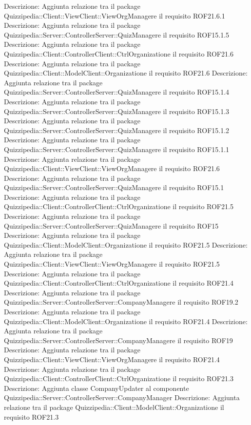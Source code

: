 Descrizione: Aggiunta relazione tra il package Quizzipedia::Client::ViewClient::ViewOrgManagere il requisito ROF21.6.1 
Descrizione: Aggiunta relazione tra il package Quizzipedia::Server::ControllerServer::QuizManagere il requisito ROF15.1.5 
Descrizione: Aggiunta relazione tra il package Quizzipedia::Client::ControllerClient::CtrlOrganizatione il requisito ROF21.6 
Descrizione: Aggiunta relazione tra il package Quizzipedia::Client::ModelClient::Organizatione il requisito ROF21.6 
Descrizione: Aggiunta relazione tra il package Quizzipedia::Server::ControllerServer::QuizManagere il requisito ROF15.1.4 
Descrizione: Aggiunta relazione tra il package Quizzipedia::Server::ControllerServer::QuizManagere il requisito ROF15.1.3 
Descrizione: Aggiunta relazione tra il package Quizzipedia::Server::ControllerServer::QuizManagere il requisito ROF15.1.2 
Descrizione: Aggiunta relazione tra il package Quizzipedia::Server::ControllerServer::QuizManagere il requisito ROF15.1.1 
Descrizione: Aggiunta relazione tra il package Quizzipedia::Client::ViewClient::ViewOrgManagere il requisito ROF21.6 
Descrizione: Aggiunta relazione tra il package Quizzipedia::Server::ControllerServer::QuizManagere il requisito ROF15.1 
Descrizione: Aggiunta relazione tra il package Quizzipedia::Client::ControllerClient::CtrlOrganizatione il requisito ROF21.5 
Descrizione: Aggiunta relazione tra il package Quizzipedia::Server::ControllerServer::QuizManagere il requisito ROF15 
Descrizione: Aggiunta relazione tra il package Quizzipedia::Client::ModelClient::Organizatione il requisito ROF21.5 
Descrizione: Aggiunta relazione tra il package Quizzipedia::Client::ViewClient::ViewOrgManagere il requisito ROF21.5 
Descrizione: Aggiunta relazione tra il package Quizzipedia::Client::ControllerClient::CtrlOrganizatione il requisito ROF21.4 
Descrizione: Aggiunta relazione tra il package Quizzipedia::Server::ControllerServer::CompanyManagere il requisito ROF19.2 
Descrizione: Aggiunta relazione tra il package Quizzipedia::Client::ModelClient::Organizatione il requisito ROF21.4 
Descrizione: Aggiunta relazione tra il package Quizzipedia::Server::ControllerServer::CompanyManagere il requisito ROF19 
Descrizione: Aggiunta relazione tra il package Quizzipedia::Client::ViewClient::ViewOrgManagere il requisito ROF21.4 
Descrizione: Aggiunta relazione tra il package Quizzipedia::Client::ControllerClient::CtrlOrganizatione il requisito ROF21.3 
Descrizione: Aggiunta classe CompanyUpdater al componente Quizzipedia::Server::ControllerServer::CompanyManager 
Descrizione: Aggiunta relazione tra il package Quizzipedia::Client::ModelClient::Organizatione il requisito ROF21.3 
